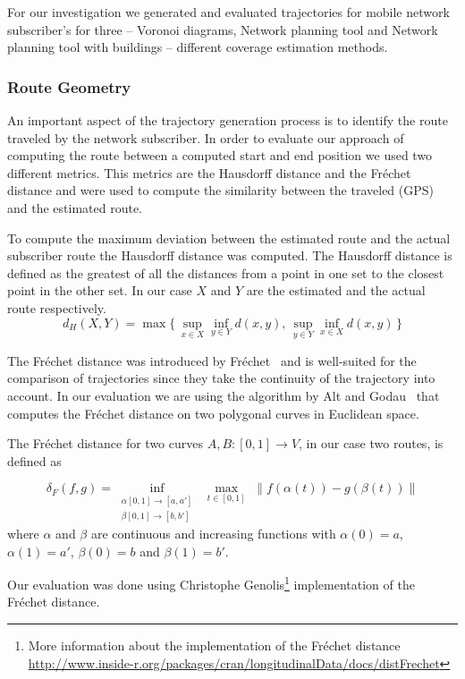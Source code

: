 For our investigation we generated and evaluated trajectories for mobile network subscriber's for three -- Voronoi diagrams, Network planning tool and Network planning tool with buildings -- different coverage estimation methods.
\subsubsection{Route Geometry}
An important aspect of the trajectory generation process is to identify the route traveled by the network subscriber. In order to evaluate our approach of computing the route between a computed start and end position we used two different metrics. This metrics are the Hausdorff distance and the Fr\'{e}chet distance and were used to compute the similarity between the traveled (GPS) and the estimated route. 

To compute the maximum deviation between the estimated route and the actual subscriber route the Hausdorff distance was computed. The Hausdorff distance is defined as the greatest of all the distances from a point in one set to the closest point in the other set. In our case $X$ and $Y$ are the estimated and the actual route respectively.
\[ d_{H}(X,Y) = \max\{\,\sup_{x \in X} \inf_{y \in Y} d(x,y),\, \sup_{y \in Y} \inf_{x \in X} d(x,y)\,\}\]

The Fr\'{e}chet distance was introduced by Fr\'{e}chet~\cite{Frechet} and is well-suited for the comparison of trajectories since they take the continuity of the trajectory into account. In our evaluation we are using the algorithm by Alt and Godau~\cite{Alt1995} that computes the Fr\'{e}chet distance on two polygonal curves in Euclidean space.

The Fr\'{e}chet distance for two curves $A,B:[0,1]\rightarrow V$, in our case two routes, is defined as 


\[\delta_F(f,g)=\inf_{\substack{\alpha [0,1] \rightarrow [a,a'] \\\beta [0,1] \rightarrow [b,b']} }\,\, \max_{t \in [0,1]} \,\, \lVert f(\alpha(t))-g(\beta(t)) \rVert\]
where $\alpha$ and $\beta$ are continuous and increasing functions with $\alpha(0)=a$, $\alpha(1)=a'$, $\beta(0)=b$ and $\beta(1)=b'$. 

Our evaluation was done using Christophe Genolis\footnote{More information about the implementation of the Fr\'{e}chet distance \url{http://www.inside-r.org/packages/cran/longitudinalData/docs/distFrechet}} implementation of the Fr\'{e}chet distance.

